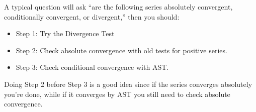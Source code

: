 A typical question will ask ``are the following series absolutely convergent,
conditionally convergent, or divergent,'' then you should:
\begin{itemize}
    \item Step 1: Try the Divergence Test
    \item Step 2: Check absolute convergence with old tests for positive series.
    \item Step 3: Check conditional convergence with AST\@.
\end{itemize}

\begin{Remark}{}{}
    Doing Step 2 before Step 3 is a good idea since if the series converges
    absolutely you're done, while if it converges by AST you still need
    to check absolute convergence.
\end{Remark}

